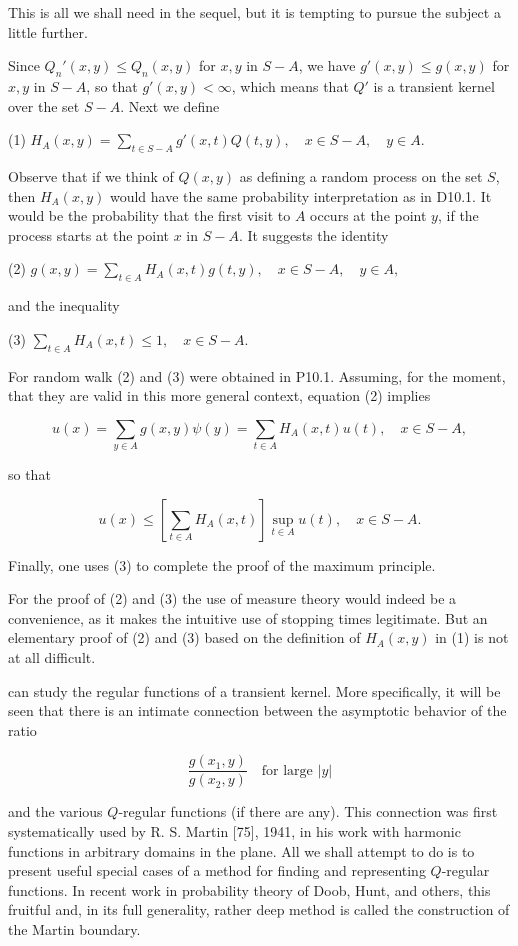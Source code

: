 This is all we shall need in the sequel, but it is tempting to pursue the subject a little further.

Since $Q_n'(x,y) \leq Q_n(x,y)$ for $x,y$ in $S-A$, we have $g'(x,y) \leq g(x,y)$ for $x,y$ in $S-A$, so that $g'(x,y) < \infty$, which means that $Q'$ is a transient kernel over the set $S-A$. Next we define

(1) $H_A(x,y) = \sum_{t \in S-A} g'(x,t)Q(t,y), \quad x \in S-A, \quad y \in A.$

Observe that if we think of $Q(x,y)$ as defining a random process on the set $S$, then $H_A(x,y)$ would have the same probability interpretation as in D10.1. It would be the probability that the first visit to $A$ occurs at the point $y$, if the process starts at the point $x$ in $S-A$. It suggests the identity

(2) $g(x,y) = \sum_{t \in A} H_A(x,t)g(t,y), \quad x \in S-A, \quad y \in A,$

and the inequality

(3) $\sum_{t \in A} H_A(x,t) \leq 1, \quad x \in S-A.$

For random walk (2) and (3) were obtained in P10.1. Assuming, for the moment, that they are valid in this more general context, equation (2) implies

$$u(x) = \sum_{y \in A} g(x,y)\psi(y) = \sum_{t \in A} H_A(x,t)u(t), \quad x \in S-A,$$

so that

$$u(x) \leq \left[ \sum_{t \in A} H_A(x,t) \right] \sup_{t \in A} u(t), \quad x \in S-A.$$

Finally, one uses (3) to complete the proof of the maximum principle.

For the proof of (2) and (3) the use of measure theory would indeed be a convenience, as it makes the intuitive use of stopping times legitimate. But an elementary proof of (2) and (3) based on the definition of $H_A(x,y)$ in (1) is not at all difficult.

can study the regular functions of a transient kernel. More specifically, it will be seen that there is an intimate connection between the asymptotic behavior of the ratio

$$\frac{g(x_1,y)}{g(x_2,y)} \quad \text{for large } |y|$$

and the various $Q$-regular functions (if there are any). This connection was first systematically used by R. S. Martin [75], 1941, in his work with harmonic functions in arbitrary domains in the plane. All we shall attempt to do is to present useful special cases of a method for finding and representing $Q$-regular functions. In recent work in probability theory of Doob, Hunt, and others, this fruitful and, in its full generality, rather deep method is called the construction of the Martin boundary.

